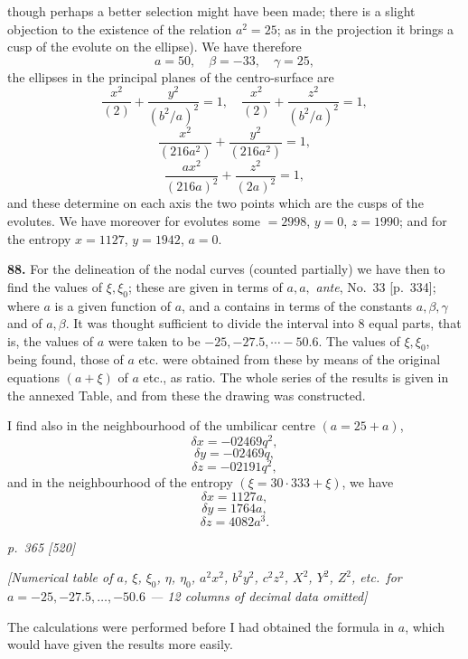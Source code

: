 \documentclass[11pt,a4paper]{book}
\begin{document}
though perhaps a better selection might have been made; there is a slight objection to the existence of the relation $a^2 = 25$; as in the projection it brings a cusp of the evolute on the ellipse). We have therefore
\[
a = 50,\quad \beta = -33,\quad \gamma = 25,
\]
the ellipses in the principal planes of the centro-surface are
\[
\frac{x^2}{(2)} + \frac{y^2}{(b^2/a)^2} = 1, \quad \frac{x^2}{(2)} + \frac{z^2}{(b^2/a)^2} = 1,
\]
\[
\frac{x^2}{(216a^2)} + \frac{y^2}{(216a^2)} = 1,
\]
\[
\frac{a x^2}{(216a)^2} + \frac{z^2}{(2a)^2} = 1,
\]
and these determine on each axis the two points which are the cusps of the evolutes. We have moreover for evolutes some $= 2998$, $y = 0$, $z = 1990$; and for the entropy $x = 1127$, $y = 1942$, $a = 0$.

\textbf{88.} For the delineation of the nodal curves (counted partially) we have then to find the values of $\xi, \xi_0$; these are given in terms of $a, a, $ \textit{ante}, No.\ 33 [p.\ 334]; where $a$ is a given function of $a$, and a contains in terms of the constants $a, \beta, \gamma$ and of $a, \beta$. It was thought sufficient to divide the interval into 8 equal parts, that is, the values of $a$ were taken to be $-25, -27.5, \cdots -50.6$. The values of $\xi, \xi_0$, being found, those of $a$ etc. were obtained from these by means of the original equations $(a + \xi)$ of $a$ etc., as ratio. The whole series of the results is given in the annexed Table, and from these the drawing was constructed.

I find also in the neighbourhood of the umbilicar centre $(a = 25 + a)$,
\[
\delta x = -02469q^2,
\]
\[
\delta y = -02469 q,
\]
\[
\delta z = -02191 q^2,
\]
and in the neighbourhood of the entropy $(\xi = 30 \cdot 333 + \xi)$, we have
\[
\delta x = 1127 a,
\]
\[
\delta y = 1764 a,
\]
\[
\delta z = 4082 a^3.
\]

\clearpage

\bigskip
\textit{p.~365 [520]}
\smallskip


\begin{center}
\textit{[Numerical table of $a$, $\xi$, $\xi_0$, $\eta$, $\eta_0$, $a^2x^2$, $b^2y^2$, $c^2z^2$, $X^2$, $Y^2$, $Z^2$, etc.\ for $a = -25, -27.5, \ldots, -50.6$ --- 12 columns of decimal data omitted]}
\end{center}

The calculations were performed before I had obtained the formula in $a$, which would have given the results more easily.
\end{document}
